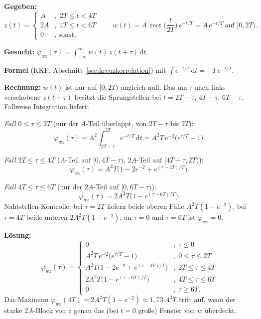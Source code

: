 \begin{beispiel}

\textbf{Gegeben:}
$$
z(t) = \begin{cases} A & , \; 2T\leq t < 4T \\ 2A & , \; 4T\leq t < 6T \\ 0 & , \; \text{sonst,} \end{cases}
\qquad
w(t) = A\,\operatorname{rect}\!\Big(\frac{t}{2T}\Big)\,e^{-t/T}
= A\,e^{-t/T}\ \text{auf } [0,2T).
$$

\textbf{Gesucht:} $\varphi_{wz}(\tau) = \int_{-\infty}^{\infty} w(t)\,z(t+\tau)\,\mathrm{d}t$.

\textbf{Formel} (KKF, Abschnitt~\ref{sec:kreuzkorrelation}) mit
$\int e^{-t/T}\,\mathrm{d}t = -T\,e^{-t/T}$.

\textbf{Rechnung:} $w(t)$ ist nur auf $[0,2T)$ ungleich null. Das um $\tau$ nach
links verschobene $z(t+\tau)$ besitzt die Sprungstellen bei $t=2T-\tau$,
$4T-\tau$, $6T-\tau$. Fallweise Integration liefert:

\emph{Fall $0\leq\tau\leq 2T$} (nur der $A$-Teil überlappt, von $2T-\tau$ bis $2T$):
$$
\varphi_{wz}(\tau) = A^2\!\!\int_{2T-\tau}^{2T}\! e^{-t/T}\,\mathrm{d}t
= A^2 T\,e^{-2}\big(e^{\tau/T}-1\big).
$$

\emph{Fall $2T\leq\tau\leq 4T$} ($A$-Teil auf $[0,4T-\tau)$, $2A$-Teil auf $[4T-\tau,2T)$):
$$
\varphi_{wz}(\tau) = A^2 T\Big(1 - 2e^{-2} + e^{(\tau-4T)/T}\Big).
$$

\emph{Fall $4T\leq\tau\leq 6T$} (nur der $2A$-Teil auf $[0,6T-\tau)$):
$$
\varphi_{wz}(\tau) = 2A^2 T\Big(1 - e^{(\tau-6T)/T}\Big).
$$
Nahtstellen-Kontrolle: bei $\tau=2T$ liefern beide oberen Fälle
$A^2T(1-e^{-2})$, bei $\tau=4T$ beide unteren $2A^2T(1-e^{-2})$; an $\tau=0$ und
$\tau=6T$ ist $\varphi_{wz}=0$. \checkmark

\textbf{Lösung:}
$$
\boxed{\;\varphi_{wz}(\tau)=\begin{cases}
0 & , \; \tau\leq 0 \\
A^2 T\,e^{-2}\big(e^{\tau/T}-1\big) & , \; 0\leq\tau\leq 2T \\
A^2 T\big(1-2e^{-2}+e^{(\tau-4T)/T}\big) & , \; 2T\leq\tau\leq 4T \\
2A^2 T\big(1-e^{(\tau-6T)/T}\big) & , \; 4T\leq\tau\leq 6T \\
0 & , \; \tau\geq 6T.
\end{cases}\;}
$$
Das Maximum $\varphi_{wz}(4T)=2A^2T(1-e^{-2})\approx 1{,}73\,A^2T$ tritt auf, wenn
der starke $2A$-Block von $z$ genau das (bei $t=0$ große) Fenster von $w$
überdeckt.
\end{beispiel}

